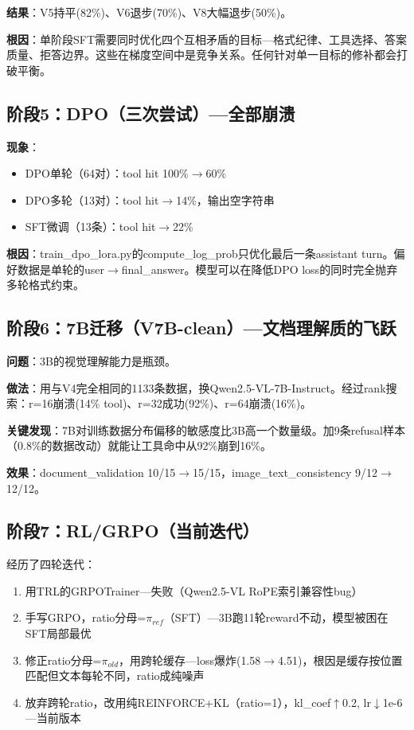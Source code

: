 \documentclass[fontset=none,11pt,a4paper]{ctexart}
\begin{document}
\textbf{结果}：V5持平(82\%)、V6退步(70\%)、V8大幅退步(50\%)。

\textbf{根因}：单阶段SFT需要同时优化四个互相矛盾的目标---格式纪律、工具选择、答案质量、拒答边界。这些在梯度空间中是竞争关系。任何针对单一目标的修补都会打破平衡。

\subsection{阶段5：DPO（三次尝试）---全部崩溃}

\textbf{现象}：
\begin{itemize}[nosep]
    \item DPO单轮（64对）：tool hit 100\%$\to$60\%
    \item DPO多轮（13对）：tool hit$\to$14\%，输出空字符串
    \item SFT微调（13条）：tool hit$\to$22\%
\end{itemize}

\textbf{根因}：train\_dpo\_lora.py的compute\_log\_prob只优化最后一条assistant turn。偏好数据是单轮的user$\to$final\_answer。模型可以在降低DPO loss的同时完全抛弃多轮格式约束。

\subsection{阶段6：7B迁移（V7B-clean）---文档理解质的飞跃}

\textbf{问题}：3B的视觉理解能力是瓶颈。

\textbf{做法}：用与V4完全相同的1133条数据，换Qwen2.5-VL-7B-Instruct。经过rank搜索：r=16崩溃(14\% tool)、r=32成功(92\%)、r=64崩溃(16\%)。

\textbf{关键发现}：7B对训练数据分布偏移的敏感度比3B高一个数量级。加9条refusal样本（0.8\%的数据改动）就能让工具命中从92\%崩到16\%。

\textbf{效果}：document\_validation 10/15$\to$15/15，image\_text\_consistency 9/12$\to$12/12。

\subsection{阶段7：RL/GRPO（当前迭代）}

经历了四轮迭代：
\begin{enumerate}[nosep]
    \item 用TRL的GRPOTrainer---失败（Qwen2.5-VL RoPE索引兼容性bug）
    \item 手写GRPO，ratio分母=$\pi_{ref}$（SFT）---3B跑11轮reward不动，模型被困在SFT局部最优
    \item 修正ratio分母=$\pi_{old}$，用跨轮缓存---loss爆炸(1.58$\to$4.51)，根因是缓存按位置匹配但文本每轮不同，ratio成纯噪声
    \item 放弃跨轮ratio，改用纯REINFORCE+KL（ratio=1），kl\_coef$\uparrow$0.2, lr$\downarrow$1e-6---当前版本
\end{enumerate}
\end{document}
